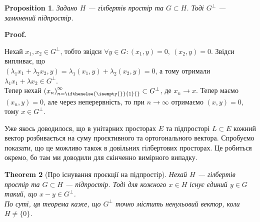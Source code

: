 \documentclass[a4paper, 10pt]{article}
\makeatletter
\theoremstyle{theoremdd}
\newtheorem{theorem}{Theorem}[subsection]
\theoremstyle{theoremdd}
\theoremstyle{theoremdd}
\theoremstyle{theoremdd}
\theoremstyle{theoremdd}
\newtheorem{proposition}[theorem]{Proposition}
\theoremstyle{theoremdd}
\newtheorem{remark}[theorem]{Remark}
\theoremstyle{theoremdd}
\theoremstyle{theoremdd}
\newcommand{\sequence}[2][]{\left({#2}\right)_{n=\ifthenelse{\isempty{#1}}{1}{#1}}^{\infty}}
\renewenvironment{proof}[1][Proof.\\]{\par
\pushQED{\hfill \qed}%
\normalfont \topsep6\p@\@plus6\p@\relax
\trivlist
\item\relax
{\bfseries
#1\@addpunct{.}}\hspace\labelsep\ignorespaces
}{%
\popQED\endtrivlist\@endpefalse
}
\DeclareMathOperator{\linspan}{span}
\makeatother
\begin{document}
\begin{proposition}
Задано $H$ --- гілбертів простір та $G \subset H$. Тоді $G^\perp$ --- замкнений підпростір.
\end{proposition}

\begin{proof}
Нехай $x_1,x_2 \in G^\perp$, тобто звідси $\forall y \in G: (x_1,y) = 0,\ (x_2,y) = 0$. Звідси випливає, що\\
$(\lambda_1 x_1 + \lambda_2 x_2, y) = \lambda_1 (x_1, y) + \lambda_2 (x_2,y) = 0$, а тому отримали $\lambda_1 x_1 + \lambda x_2 \in G^\perp$.\\
Тепер нехай $\sequence{x_n} \subset G^\perp$, де $x_n \to x$. Тепер маємо $(x_n,y) = 0$, але через неперервність, то при $n \to \infty$ отримаємо $(x,y) = 0$, тому $x \in G^\perp$.
\end{proof}

\noindent
Уже якось доводилося, що в унітарних просторах $E$ та підпросторі $L \subset E$ кожний вектор розбивається на суму проєктивного та ортогонального вектора. Спробуємо показати, що це можливо також в довільних гілбертових просторах. Це робиться окремо, бо там ми доводили для скінченно вимірного випадку.

\begin{theorem}[Про існування проєкції на підпростір]
Нехай $H$ --- гілбертів простір та $G \subset H$ --- підпростір. Тоді для кожного $x \in H$ існує єдиний $y \in G$ такий, що $x-y \in G^{\perp}$.\\
\textit{По суті, ця теорема каже, що $G^\perp$ точно містить ненульовий вектор, коли $H \neq \{0\}$.}
\end{theorem}
\end{document}
